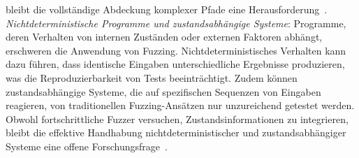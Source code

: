 bleibt die vollständige Abdeckung komplexer Pfade eine Herausforderung~\cite{noller_badger_2018}.\newline
\textit{Nichtdeterministische Programme und zustandsabhängige Systeme}:
Programme, deren Verhalten von internen Zuständen oder externen Faktoren abhängt, erschweren die Anwendung von Fuzzing.
Nichtdeterministisches Verhalten kann dazu führen, dass identische Eingaben unterschiedliche Ergebnisse produzieren, was
die Reproduzierbarkeit von Tests beeinträchtigt.
Zudem können zustandsabhängige Systeme, die auf spezifischen Sequenzen von Eingaben reagieren, von traditionellen
Fuzzing-Ansätzen nur unzureichend getestet werden.
Obwohl fortschrittliche Fuzzer versuchen, Zustandsinformationen zu integrieren, bleibt die effektive Handhabung
nichtdeterministischer und zustandsabhängiger Systeme eine offene Forschungsfrage~\cite{she_fox_2024,pham_aflnet_2020}.

